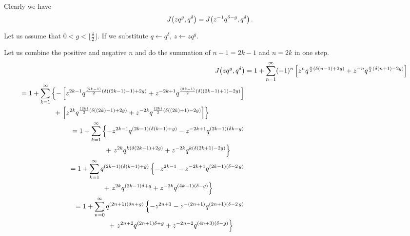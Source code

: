 \documentclass{article}
\begin{document}
Clearly we have
\begin{align}
  J\!\left(zq^g,q^\delta\right)
  &=
  J\!\left(z^{-1}q^{\delta-g},q^\delta\right).
  \label{eq:Jacobi-g-delta-g}
\end{align}

Let us assume that $0 < g < \lfloor \frac{\delta}{2}\rfloor$.
If we substitute $q \gets q^\delta$, $z \gets z q^g$.

Let us combine the positive and negative $n$ and do the summation of
$n-1=2k-1$ and $n=2k$ in one step.
\begin{align}
  J\!\left(zq^g,q^\delta\right)
  &=
    1 + \sum_{n=1}^\infty (-1)^n \left[
    z^n q^{\frac{n}{2}(\delta (n-1) + 2 g)}
    +
    z^{-n} q^{\frac{n}{2}(\delta (n+1) - 2 g)}
    \right]
  \\
  \begin{split}
  &=
    1 + \sum_{k=1}^\infty
    \left\{
    -\left[
    z^{2k-1}
    q^{\frac{(2k-1)}{2}(\delta ((2k-1)-1) + 2 g)}
    +
    z^{-2k+1}
    q^{\frac{(2k-1)}{2}(\delta ((2k-1)+1) - 2 g)}
    \right]
    \right.
  \notag\\
  &\qquad\qquad\quad
    +
    \left.
    \left[
    z^{2k}
    q^{\frac{(2k)}{2}(\delta ((2k)-1) + 2 g)}
    +
    z^{-2k}
    q^{\frac{(2k)}{2}(\delta ((2k)+1) - 2 g)}
    \right]
  \right\}
  \end{split}
  \notag\\
  \begin{split}
  &=
    1 + \sum_{k=1}^\infty
    \left\{
    -
    z^{2k-1}
    q^{(2k-1)(\delta (k-1) + g)}
    -
    z^{-2k+1}
    q^{(2k-1)(\delta k - g)}
    \right.
  \notag\\
  &\qquad\qquad\quad
    +
    \left.
    z^{2k}
    q^{k (\delta (2k-1) + 2 g)}
    +
    z^{-2k}
    q^{k (\delta (2k+1) - 2 g)}
  \right\}
  \end{split}
  \notag\\
  \begin{split}
  &=
    1 + \sum_{k=1}^\infty
    q^{(2k-1)(\delta (k-1) + g)}
    \left\{
    -
    z^{2k-1}
    -
    z^{-2k+1}
    q^{(2 k - 1) (\delta -2\, g)}
    \right.
    \notag\\
    &\qquad\qquad\quad
    +
    \left.
    z^{2k}
    q^{(2 k - 1) \delta + g}
    +
    z^{-2k}
    q^{(4k-1) (\delta - g)}
  \right\}
  \end{split}
  \notag\\
  \begin{split}
  &=
    1 + \sum_{n=0}^\infty
    q^{(2n+1)(\delta n + g)}
    \left\{
    -
    z^{2n+1}
    -
    z^{-(2n+1)}
    q^{(2n+1) (\delta -2\, g)}
    \right.
    \notag\\
    &\qquad\qquad\quad
    +
    \left.
    z^{2n+2}
    q^{(2 n + 1) \delta + g}
    +
    z^{-2n-2}
    q^{(4n+3) (\delta - g)}
  \right\}
  \end{split}
\end{align}
\end{document}
